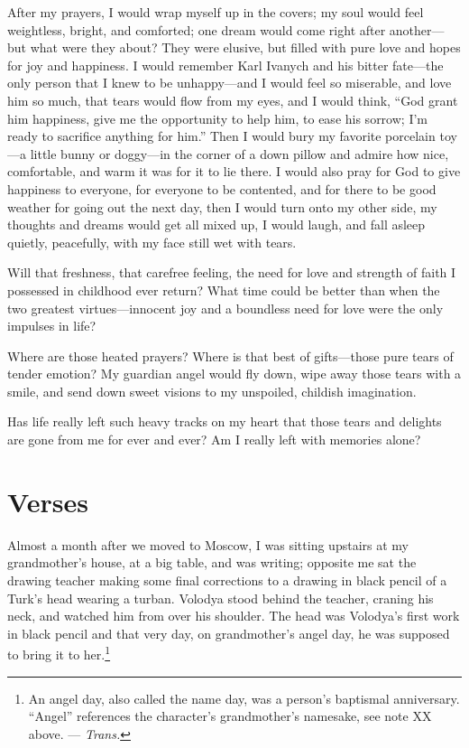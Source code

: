 After my prayers, I would wrap myself up in the covers; my soul would feel weightless, bright, and comforted; one dream would come right after another---but what were they about? They were elusive, but filled with pure love and hopes for joy and happiness. I would remember Karl Ivanych and his bitter fate---the only person that I knew to be unhappy---and I would feel so miserable, and love him so much, that tears would flow from my eyes, and I would think, ``God grant him happiness, give me the opportunity to help him, to ease his sorrow; I'm ready to sacrifice anything for him.'' Then I would bury my favorite porcelain toy---a little bunny or doggy---in the corner of a down pillow and admire how nice, comfortable, and warm it was for it to lie there. I would also pray for God to give happiness to everyone, for everyone to be contented, and for there to be good weather for going out the next day, then I would turn onto my other side, my thoughts and dreams would get all mixed up, I would laugh, and fall asleep quietly, peacefully, with my face still wet with tears.

Will that freshness, that carefree feeling, the need for love and strength of faith I possessed in childhood ever return? What time could be better than when the two greatest virtues---innocent joy and a boundless need for love were the only impulses in life?

Where are those heated prayers? Where is that best of gifts---those pure tears of tender emotion? My guardian angel would fly down, wipe away those tears with a smile, and send down sweet visions to my unspoiled, childish imagination.

Has life really left such heavy tracks on my heart that those tears and delights are gone from me for ever and ever? Am I really left with memories alone?

\chapter{Verses} %

Almost a month after we moved to Moscow, I was sitting upstairs at my grandmother's house, at a big table, and was writing; opposite me sat the drawing teacher making some final corrections to a drawing in black pencil of a Turk's head wearing a turban. Volodya stood behind the teacher, craning his neck, and watched him from over his shoulder. The head was Volodya's first work in black pencil and that very day, on grandmother's angel day, he was supposed to bring it to her.\footnote{An angel day, also called the name day, was a person's baptismal anniversary. ``Angel'' references the character's grandmother's namesake, see note XX above. --- \textit{Trans.}} 

